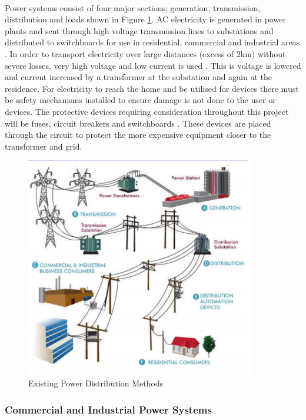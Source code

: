 \paragraph{}
Power systems consist of four major sections; generation, transmission, distribution and loads shown in Figure \ref{fig:ExistingPower}. AC electricity is generated in power plants and sent through high voltage transmission lines to substations and distributed to switchboards for use in residential, commercial and industrial areas \cite{Amin2011}. In order to transport electricity over large distances (excess of 2km) without severe losses, very high voltage and low current is used \cite{Amin2011}. This is voltage is lowered and current increased by a transformer at the substation and again at the residence. For electricity to reach the home and be utilised for devices there must be safety mechanisms installed to ensure damage is not done to the user or devices. The protective devices requiring consideration throughout this project will be fuses, circuit breakers and switchboards \cite{UnitedStatesDepartmentoftheInterior2000}. These devices are placed through the circuit to protect the more expensive equipment closer to the transformer and grid.  

\begin{figure}[H]
\hfill\includegraphics[width = 100mm]{images/Power_Distro}\hspace*{\fill}
\caption{Existing Power Distribution Methods \cite{Active2015}}
\label{fig:ExistingPower}
\end{figure}

\subsubsection{Commercial and Industrial Power Systems}

